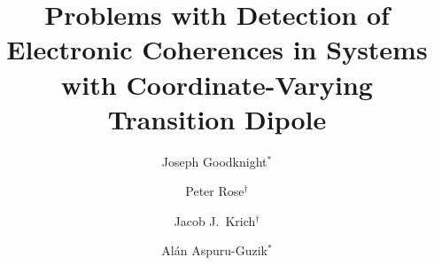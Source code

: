 



\title{Problems with Detection of Electronic Coherences in Systems with Coordinate-Varying Transition Dipole}

\author{Joseph Goodknight$^*$}
\author{Peter Rose$^{\dagger}$}
\author{Jacob J.\ Krich$^{\dagger}$}
\author{Al\'an Aspuru-Guzik$^*$}
\

\begin{abstract}
  
\end{abstract}

\maketitle








